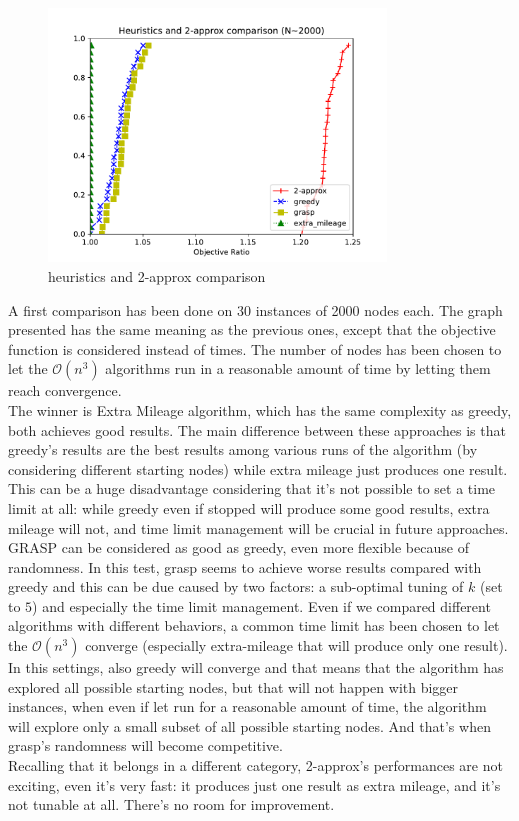 \begin{figure}[h]
    \centering
    \includegraphics[width=0.8\textwidth]{figures/heuristic_firstcomp}
    \caption{heuristics and 2-approx comparison}
\end{figure}

A first comparison has been done on 30 instances of 2000 nodes each. The graph
presented has the same meaning as the previous ones, except that
the objective function is considered instead of times. The number of nodes has
been chosen to let the $\mathcal{O}(n^3)$ algorithms run in a reasonable amount
of time by letting them reach convergence. \\
The winner is Extra Mileage algorithm, which has the same
complexity as greedy, both achieves good results. The main difference between
these approaches is that greedy's results are the best results among various
runs of the algorithm (by considering different starting nodes) while extra
mileage just produces one result. This can be a huge disadvantage considering
that it's not possible to set a time limit at all: while greedy even if stopped
will produce some good results, extra mileage will not, and time limit
management will be crucial in future approaches. \\
GRASP can be considered as good as greedy, even more flexible because of
randomness. In this test, grasp seems to achieve worse results compared with
greedy and this can be due caused by two factors: a sub-optimal tuning of $k$
(set to $5$) and especially the time limit management. Even if we compared
different algorithms with different behaviors, a common time limit has been
chosen to let the $\mathcal{O}(n^3)$ converge (especially extra-mileage
that will produce only one result). In this settings, also greedy will converge
and that means that the algorithm has explored all possible starting nodes, but
that will not happen with bigger instances, when even if let run for a
reasonable amount of time, the algorithm will explore only a small subset of all
possible starting nodes. And that's when grasp's randomness will become
competitive.\\ 
Recalling that it belongs in a different category, 2-approx's performances are not
exciting, even it's very fast: it produces just one result as extra mileage, and
it's not tunable at all. There's no room for improvement.


